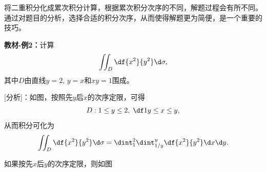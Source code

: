 % 

将二重积分化成累次积分计算，根据累次积分次序的不同，解题过程会有所不同。
通过对题目的分析，选择合适的积分次序，从而使得解题更为简便，是一个重要的技巧。

{\bf 教材-例2：}计算
$$\iint_D\df{x^2}{y^2}\d\sigma,$$
其中$D$由直线$y=2,\,y=x$和$xy=1$围成。

\begin{center}
\end{center}

[分析]：如图，按照先$y$后$x$的次序定限，可得
$$D:1\leq y\leq 2,\;\df1y\leq x\leq y,$$
从而积分可化为
$$\iint_D\df{x^2}{y^2}\d\sigma
=\dint_1^2\dint_{1/y}^y\df{x^2}{y^2}\d x\d y.$$

如果按先$x$后$y$的次序定限，则如图

